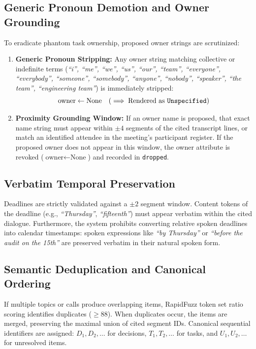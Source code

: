 \documentclass[10pt,a4paper]{article}
\begin{document}
\subsection{Generic Pronoun Demotion and Owner Grounding}
To eradicate phantom task ownership, proposed owner strings are scrutinized:
\begin{enumerate}
    \item \textbf{Generic Pronoun Stripping:} Any owner string matching collective or indefinite terms (\textit{``i'', ``me'', ``we'', ``us'', ``our'', ``team'', ``everyone'', ``everybody'', ``someone'', ``somebody'', ``anyone'', ``nobody'', ``speaker'', ``the team'', ``engineering team''}) is immediately stripped:
    \begin{equation}
    \text{owner} \leftarrow \text{None} \quad (\implies \text{Rendered as \texttt{Unspecified}})
    \end{equation}
    \item \textbf{Proximity Grounding Window:} If an owner name is proposed, that exact name string must appear within $\pm 4$ segments of the cited transcript lines, or match an identified attendee in the meeting's participant register. If the proposed owner does not appear in this window, the owner attribute is revoked ($\text{owner} \leftarrow \text{None}$) and recorded in \texttt{dropped}.
\end{enumerate}

\subsection{Verbatim Temporal Preservation}
Deadlines are strictly validated against a $\pm 2$ segment window. Content tokens of the deadline (e.g., \textit{``Thursday''}, \textit{``fifteenth''}) must appear verbatim within the cited dialogue. Furthermore, the system prohibits converting relative spoken deadlines into calendar timestamps: spoken expressions like \textit{``by Thursday''} or \textit{``before the audit on the 15th''} are preserved verbatim in their natural spoken form.

\subsection{Semantic Deduplication and Canonical Ordering}
If multiple topics or calls produce overlapping items, RapidFuzz token set ratio scoring identifies duplicates ($\ge 88$). When duplicates occur, the items are merged, preserving the maximal union of cited segment IDs. Canonical sequential identifiers are assigned: $D_1, D_2, \dots$ for decisions, $T_1, T_2, \dots$ for tasks, and $U_1, U_2, \dots$ for unresolved items.
\end{document}
